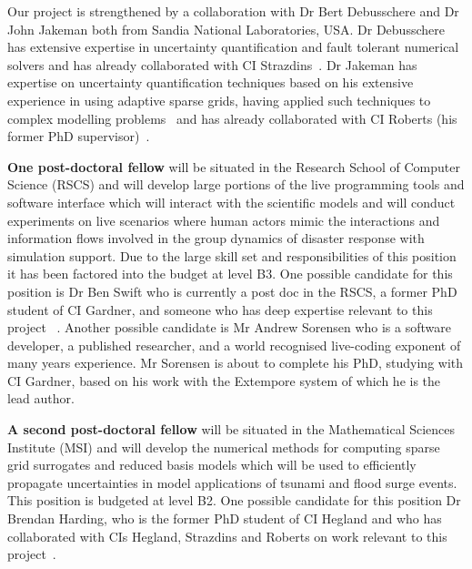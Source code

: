 Our project is strengthened by a collaboration  with Dr
Bert Debusschere and Dr John Jakeman both from Sandia National
Laboratories, USA. Dr Debusschere
has extensive expertise in uncertainty quantification and fault
tolerant numerical solvers and has already collaborated with CI
Strazdins~\parencite{parSGCT16}.  
Dr Jakeman has expertise on uncertainty
quantification techniques based on his extensive experience in using
adaptive sparse grids, having applied such techniques to complex
modelling problems~\parencite{JakemanRoberts2013,jakemanNumerical2010,
  Jakeman2015} and has already collaborated with CI Roberts (his
former PhD supervisor)~\parencite{JakemanRoberts2013}.  

\iffalse
Both  Dr Debusschere and Dr Jakeman
have offered to host visits from our group to the Livermore and
Albuquerque Sandia Laboratories. We plan to support reciprocal visits
to ANU.
\fi

{\bf One post-doctoral fellow} will be situated in the Research School
of Computer Science (RSCS) and will develop large portions of the live
programming tools and software interface which will interact with the
scientific models and will conduct experiments on live scenarios where
human actors mimic the interactions and information flows involved in
the group dynamics of disaster response with simulation support. Due
to the large skill set and responsibilities of this position it has
been factored into the budget at level B3.  One possible candidate for
this position is Dr Ben Swift who is currently a post doc in the RSCS, a
former PhD student of CI Gardner, and someone who has
deep expertise relevant to this project
~\parencite{martin2015tracking,martin2016intelligent,swiftLive2016,
  swift2013visual,swift2014coding}. Another possible candidate is Mr 
  Andrew Sorensen who is a software developer, a published researcher, and a
   world recognised live-coding exponent of many years experience. 
  Mr Sorensen is about to complete his PhD, studying with CI Gardner, based
  on his work with the Extempore system of which he is the lead author.

{\bf A second post-doctoral fellow} will be situated in the
Mathematical Sciences Institute (MSI) and will develop the numerical methods for computing
sparse grid surrogates and reduced basis models which will be used to
efficiently propagate uncertainties in model applications of tsunami
and flood surge events. This position is budgeted at level B2.  One possible candidate for this position Dr Brendan Harding, who 
is the former PhD student of CI Hegland and who has
collaborated with CIs Hegland, Strazdins and Roberts on work
relevant to this project~\parencite{Ali11022016, AliEtal2015,
  deBaarHarding2015, HardingHLS2015, sgctalg15}.


